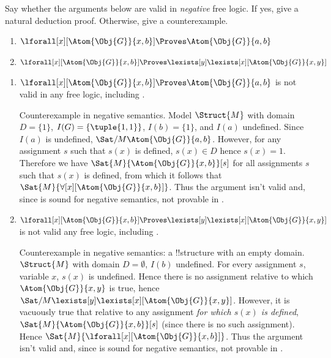 \documentclass[../../../include/open-logic-section]{subfiles}
\begin{document}

\newpage
{}


\begin{prob}
    Say whether the arguments below are valid in \emph{negative} free
    logic. If yes, give a natural deduction proof. Otherwise, give a
    counterexample.
    \begin{enumerate}
        \item $\lforall[x][\Atom{\Obj{G}}{x,b}] \Proves
        \Atom{\Obj{G}}{a,b}$
        \item $\lforall[x][\Atom{\Obj{G}}{x,b}] \Proves
        \lexists[y]\lexists[x][\Atom{\Obj{G}}{x,y}]$
    \end{enumerate}

    \begin{ans}
    \begin{enumerate}
    \item$\lforall[x][\Atom{\Obj{G}}{x,b}] \Proves \Atom{\Obj{G}}{a,b}$
    is not valid in any free logic, including .
    
    Counterexample in negative semantics. Model $\Struct{M}$ with
    domain $D=\{1\}$, $I(G)=\{\tuple{1,1}\}$, $I(b)=\{1\}$, and $I(a)$
    undefined. Since $I(a)$ is undefined,
    $\Sat/{M}{\Atom{\Obj{G}}{a,b}}$. However, for any assignment $s$
    such that $s(x)$ is defined, $s(x)\in D$ hence $s(x)=1$. Therefore
    we have $\Sat{M}{\Atom{\Obj{G}}{x,b}}[s]$ for all assignments $s$
    such that $s(x)$ is defined, from which it follows that
    $\Sat{M}{\forall[x][\Atom{\Obj{G}}{x,b}]}$. Thus the argument
    isn't valid and, since  is sound for negative semantics,
    not provable in .
    
    \item $\lforall[x][\Atom{\Obj{G}}{x,b}] \Proves 
    \lexists[y]\lexists[x][\Atom{\Obj{G}}{x,y}]$ is 
    not valid any free logic, including . 

    Counterexample in negative semantics: a !!{structure} with an
    empty domain. $\Struct{M}$ with domain $D=\emptyset$, $I(b)$
    undefined. For every assignment $s$, variable $x$, $s(x)$ is
    undefined. Hence there is no assignment relative to which
    $\Atom{\Obj{G}}{x,y}$ is true, hence
    $\Sat/{M}{\lexists[y]\lexists[x][\Atom{\Obj{G}}{x,y}]}$. However,
    it is vacuously true that relative to any assignment \emph{for
    which $s(x)$ is defined}, $\Sat{M}{\Atom{\Obj{G}}{x,b}}[s]$ (since
    there is no such assignment). Hence
    $\Sat{M}{\lforall[x][\Atom{\Obj{G}}{x,b}]}$. Thus the argument
    isn't valid and, since  is sound for negative semantics,
    not provable in .


\end{enumerate}
\end{ans}
\end{prob}
\end{document}
